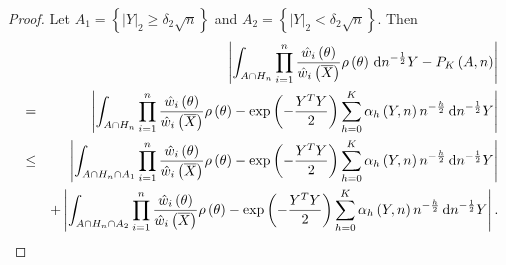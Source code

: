 \begin{proof}
Let $A_{1}=\left\{ \left|Y\right|_{2}\ge\delta_{2}\sqrt{n}\right\} $
and $A_{2}=\left\{ \left|Y\right|_{2}<\delta_{2}\sqrt{n}\right\} $.
Then 
\begin{eqnarray*}
 &  & \left|\int_{A\cap H_{n}}\prod_{i=1}^{n}\frac{\hat{w}_{i}\left(\theta\right)}{\hat{w}_{i}\left(\overline{X}\right)}\rho\left(\theta\right)\,\mathrm{d} n^{-\frac{1}{2}}Y-P_{K}\left(A,n\right)\right|\\
 & = & \left|\int_{A\cap H_{n}}\prod_{i=1}^{n}\frac{\hat{w}_{i}\left(\theta\right)}{\hat{w}_{i}\left(\overline{X}\right)}\rho\left(\theta\right)-\exp\left(-\frac{Y^{T}Y}{2}\right)\sum_{h=0}^{K}\alpha_{h}\left(Y,n\right)n^{-\frac{h}{2}}\,\mathrm{d} n^{-\frac{1}{2}}Y\right|\\
 & \le & \left|\int_{A\cap H_{n}\cap A_{1}}\prod_{i=1}^{n}\frac{\hat{w}_{i}\left(\theta\right)}{\hat{w}_{i}\left(\overline{X}\right)}\rho\left(\theta\right)-\exp\left(-\frac{Y^{T}Y}{2}\right)\sum_{h=0}^{K}\alpha_{h}\left(Y,n\right)n^{-\frac{h}{2}}\,\mathrm{d} n^{-\frac{1}{2}}Y\right|\\
 &  & +\left|\int_{A\cap H_{n}\cap A_{2}}\prod_{i=1}^{n}\frac{\hat{w}_{i}\left(\theta\right)}{\hat{w}_{i}\left(\overline{X}\right)}\rho\left(\theta\right)-\exp\left(-\frac{Y^{T}Y}{2}\right)\sum_{h=0}^{K}\alpha_{h}\left(Y,n\right)n^{-\frac{h}{2}}\,\mathrm{d} n^{-\frac{1}{2}}Y\right|.
\end{eqnarray*}



\end{proof}
